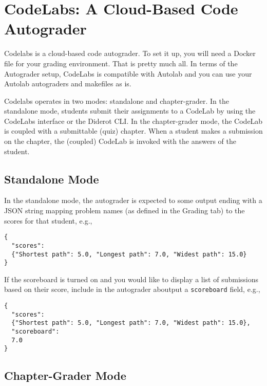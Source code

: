 \chapter{CodeLabs: A Cloud-Based Code Autograder}
\label{ch:codelabs}

Codelabs is a cloud-based code autograder.  To set it up, you will
need a Docker file for your grading environment.  That is pretty much
all.  In terms of the Autograder setup, CodeLabs is compatible with
Autolab and you can use your Autolab autograders and makefiles as is.

Codelabs operates in two modes: standalone and chapter-grader. 
%
In the standalone mode, students submit their assignments to a CodeLab
by using the CodeLabs interface or the Diderot CLI.
%
In the chapter-grader mode, the CodeLab is coupled with a submittable
(quiz) chapter.
%
When a student makes a submission on the chapter, the (coupled) CodeLab is invoked with the answers of the student.

\section{Standalone Mode}
\label{sec:codelabs::standalone}

\begin{gram}
\label{sec:codelabs::standalone::output}

In the standalone mode, the autograder is expected to some output ending with a JSON string mapping problem names (as defined in the Grading tab) to the scores for that student, e.g.,
  
\begin{lstlisting}
{
  "scores":
  {"Shortest path": 5.0, "Longest path": 7.0, "Widest path": 15.0}
}
\end{lstlisting}

If the scoreboard is turned on and you would like to display a list of
submissions based on their score, include in the autograder aboutput a \lstinline`scoreboard` field, e.g.,


\begin{lstlisting}
{
  "scores":
  {"Shortest path": 5.0, "Longest path": 7.0, "Widest path": 15.0},
  "scoreboard": 
  7.0  
}
\end{lstlisting}
  
\end{gram}


\section{Chapter-Grader Mode}
\label{sec:codelabs::chapter}

